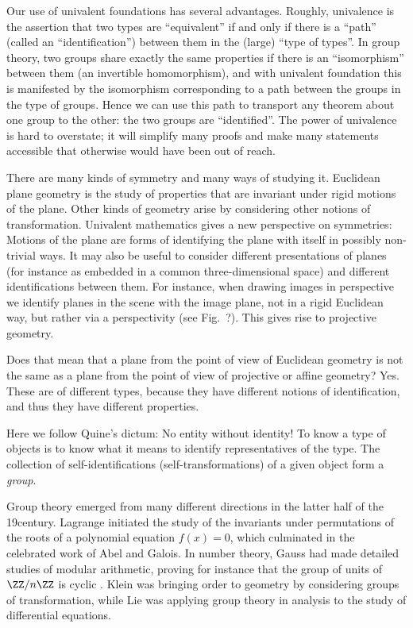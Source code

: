 Our use of univalent foundations has several advantages. Roughly, univalence is the assertion that two types are ``equivalent'' if and only if there is a ``path'' (called an ``identification'') between them in the (large) ``type of types''. In group theory, two groups share exactly the same properties if there is an ``isomorphism'' between them (an invertible homomorphism), and with univalent foundation this is manifested by the isomorphism corresponding to a path between the groups in the type of groups. Hence we can use this path to transport any theorem about one group to the other: the two groups are ``identified''. The power of univalence is hard to overstate; it will simplify many proofs and make many statements accessible that otherwise would have been out of reach.

There are many kinds of symmetry and many ways of studying it.
Euclidean plane geometry is the study of properties that are invariant under rigid motions of the plane.
Other kinds of geometry arise by considering other notions of transformation.
Univalent mathematics gives a new perspective on symmetries:
Motions of the plane are forms of identifying the plane with itself in possibly non-trivial ways.
It may also be useful to consider different presentations of planes
(for instance as embedded in a common three-dimensional space)
and different identifications between them.
For instance, when drawing images in perspective
we identify planes in the scene with the image plane,
not in a rigid Euclidean way, but
rather via a perspectivity (see Fig.~?).
This gives rise to projective geometry.

Does that mean that a plane from the point of view of Euclidean
geometry is not the same as a plane from the point of view of
projective or affine geometry?
Yes.
These are of different types,
because they have different notions of identification,
and thus they have different properties.

Here we follow Quine's dictum: No entity without identity!
To know a type of objects is to know what it means to identify representatives of the type.
The collection of self-identifications (self-transformations) of a given object form a \emph{group}.


Group theory emerged from many different directions in the latter half of the 19\th century.
Lagrange initiated the study of the invariants under permutations
of the roots of a polynomial equation $f(x)=0$,
which culminated in the celebrated work of Abel and Galois.
In number theory, Gauss had made detailed studies of modular arithmetic,
proving for instance that the group of units of 
 $\ZZ/n\ZZ$ is cyclic .
Klein was bringing order to geometry by considering groups of transformation,
while Lie was applying group theory in analysis to the study of differential equations.

